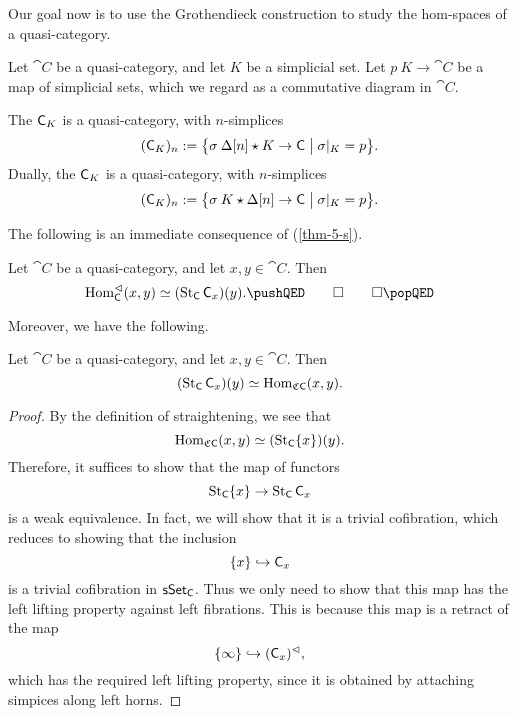Our goal now is to use the Grothendieck construction 
to study the hom-spaces of a quasi-category.

Let $\cat C$ be a quasi-category, and let $K$ be a simplicial set.
Let $p\:K\to\cat C$ be a map of simplicial sets,
which we regard as a commutative diagram in $\cat C$.

\begin{definition}
    The  $\textup{\textsf{C}}_{\/K}$ is a quasi-category,
    with $n$-simplices
    \[ (\textup{\textsf{C}}_{\/K})_n:=\bigl\{\sigma\:\Delta[n]\star K\to\textup{\textsf{C}}\mathrel{\big|}\sigma|_K=p\bigr\}. \]
    Dually, the  $\textup{\textsf{C}}_{K\/}$ is a quasi-category,
    with $n$-simplices
    \[ (\textup{\textsf{C}}_{K\/})_n:=\bigl\{\sigma\:K\star\Delta[n]\to\textup{\textsf{C}}\mathrel{\big|}\sigma|_K=p\bigr\}. \]
\end{definition}

The following is an immediate consequence of (\ref{thm-5-s}).

\begin{corollary}
    Let $\cat C$ be a quasi-category, and let $x,y\in\cat C$. Then 
    \[ \Hom_{\cat C}^\vartriangleleft(x,y)\simeq(\operatorname{St}_{\cat C}\cat C_{x\/})(y).
    \thmqedhere \]
\end{corollary}

Moreover, we have the following.

\begin{proposition}
    Let $\cat C$ be a quasi-category, and let $x,y\in\cat C$. Then 
    \[ (\operatorname{St}_{\textup{\textsf{C}}}\textup{\textsf{C}}_{x\/})(y)\simeq\operatorname{Hom}_{\mathfrak C\textup{\textsf{C}}}(x,y). \]
\end{proposition}

\begin{proof}
    By the definition of straightening, we see that 
    \[ \operatorname{Hom}_{\mathfrak C\textup{\textsf{C}}}(x,y) \simeq (\operatorname{St}_{\textup{\textsf{C}}}\{x\})(y). \]
    Therefore, it suffices to show that the map of functors 
    \[ \operatorname{St}_{\textup{\textsf{C}}}\{x\} \to \operatorname{St}_{\textup{\textsf{C}}}\textup{\textsf{C}}_{x\/} \]
    is a weak equivalence. In fact, we will show that it is a trivial cofibration,
    which reduces to showing that the inclusion
    \[ \{x\} \hookrightarrow \textup{\textsf{C}}_{x\/} \]
    is a trivial cofibration in $\textup{\textsf{sSet}}_{\/\textup{\textsf{C}}}$.
    Thus we only need to show that this map has the left lifting property against left fibrations.
    This is because this map is a retract of the map 
    \[ \{\infty\} \hookrightarrow (\textup{\textsf{C}}_{x\/})^\vartriangleleft, \]
    which has the required left lifting property,
    since it is obtained by attaching simpices along left horns.
\end{proof}

